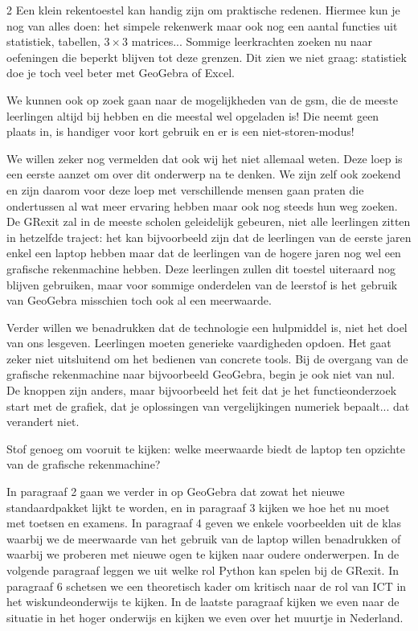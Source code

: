 \begin{multicols}{2}
Een klein rekentoestel kan handig zijn om praktische redenen. Hiermee kun je nog van alles doen: het simpele rekenwerk maar ook nog een aantal functies uit statistiek, tabellen, $3 \times 3$ matrices... Sommige leerkrachten zoeken nu naar oefeningen die beperkt blijven tot deze grenzen. Dit zien we niet graag: statistiek doe je toch veel beter met GeoGebra of Excel.

We kunnen ook op zoek gaan naar de mogelijkheden van de gsm, die de meeste leerlingen altijd bij hebben en die meestal wel opgeladen is! Die neemt geen plaats in, is handiger voor kort gebruik en er is een niet-storen-modus!

We willen zeker nog vermelden dat ook wij het niet allemaal weten. Deze loep is een eerste aanzet om over dit onderwerp na te denken. We zijn zelf ook zoekend en zijn daarom voor deze loep met verschillende mensen gaan praten die ondertussen al wat meer ervaring hebben maar ook nog steeds hun weg zoeken. De GRexit zal in de meeste scholen geleidelijk gebeuren, niet alle leerlingen zitten in hetzelfde traject: het kan bijvoorbeeld zijn dat de leerlingen van de eerste jaren enkel een laptop hebben maar dat de leerlingen van de hogere jaren nog wel een grafische rekenmachine hebben. Deze leerlingen zullen dit toestel uiteraard nog blijven gebruiken, maar voor sommige onderdelen van de leerstof is het gebruik van GeoGebra misschien toch ook al een meerwaarde.

Verder willen we benadrukken dat de technologie een hulpmiddel is, niet het doel van ons lesgeven. Leerlingen moeten generieke vaardigheden opdoen. Het gaat zeker niet uitsluitend om het bedienen van concrete tools. Bij de overgang van de grafische rekenmachine naar bijvoorbeeld \mbox{GeoGebra}, begin je ook niet van nul. De knoppen zijn anders, maar bijvoorbeeld het feit dat je het functieonderzoek start met de grafiek, dat je oplossingen van vergelijkingen numeriek bepaalt... dat verandert niet. 

Stof genoeg om vooruit te kijken: welke meerwaarde biedt de laptop ten opzichte van de grafische rekenmachine?

In paragraaf 2 gaan we verder in op GeoGebra dat zowat het nieuwe standaardpakket lijkt te worden, en in paragraaf 3 kijken we hoe het nu moet met toetsen en examens. In paragraaf 4 geven we enkele voorbeelden uit de klas waarbij we de meerwaarde van het gebruik van de laptop willen benadrukken of waarbij we proberen met nieuwe ogen te kijken naar oudere onderwerpen. In de volgende paragraaf leggen we uit welke rol Python kan spelen bij de GRexit. In paragraaf 6 schetsen we een theoretisch kader om kritisch naar de rol van ICT in het wiskundeonderwijs te kijken. In de laatste paragraaf kijken we even naar de situatie in het hoger onderwijs en kijken we even over het muurtje in Nederland.


\end{multicols}
